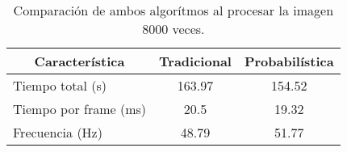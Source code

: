 \begin{table}
\begin{center}
\begin{tabular}{| l | c | c |}
\hline
\multicolumn{1}{|c|}{Característica}	 & 	\multicolumn{1}{c|}{Tradicional}	 & 	\multicolumn{1}{c|}{Probabilística}\\ \hline
Tiempo total (s)	& 	163.97	 &	154.52\\ \hline
Tiempo por frame (ms)	& 	20.5	 & 	19.32\\ \hline
Frecuencia (Hz)		& 	48.79	 & 	51.77\\ \hline
\end{tabular}
\caption{Comparación de ambos algorítmos al procesar la imagen 8000 veces.}
\label{tab_compeiffel}
\end{center}
\end{table}
